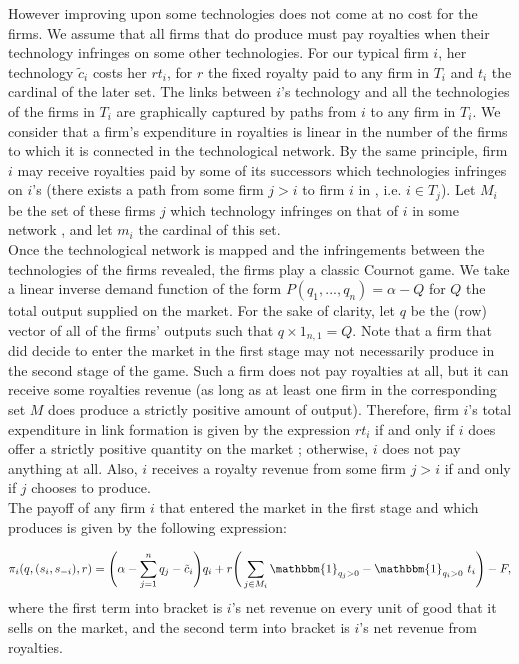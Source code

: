 \documentclass{article}
\begin{document}
\indent However improving upon some technologies does not come at no cost for the firms. We assume that all firms that do produce must pay royalties when their technology infringes on some other technologies. For our typical firm $i$, her technology $\tilde{c}_i$ costs her $rt_i$, for $r$ the fixed royalty paid to any firm in $T_i$ and $t_i$ the cardinal of the later set. The links between $i$'s technology and all the technologies of the firms in $T_i$ are graphically captured by paths from $i$ to any firm in $T_i$. We consider that a firm's expenditure in royalties is linear in the number of the firms to which it is connected in the technological network. By the same principle, firm $i$ may receive royalties paid by some of its successors which technologies infringes on $i$'s (there exists a path from some firm $j>i$ to firm $i$ in , i.e. $i\in T_j$). Let $M_i$ be the set of these firms $j$ which technology infringes on that of $i$ in some network , and let $m_i$ the cardinal of this set.\\

\indent Once the technological network is mapped and the infringements between the technologies of the firms revealed, the firms play a classic Cournot game. We take a linear inverse demand function of the form $P(q_1,...,q_n)=\alpha - Q$ for $Q$ the total output supplied on the market. For the sake of clarity, let $q$ be the (row) vector of all of the firms' outputs such that $q\times 1_{n,1}=Q$. Note that a firm that did decide to enter the market in the first stage may not necessarily produce in the second stage of the game. Such a firm does not pay royalties at all, but it can receive some royalties revenue (as long as at least one firm in the corresponding set $M$ does produce a strictly positive amount of output). Therefore, firm $i$'s total expenditure in link formation is given by the expression $r t_i$ if and only if $i$ does offer a strictly positive quantity on the market ; otherwise, $i$ does not pay anything at all. Also, $i$ receives a royalty revenue from some firm $j>i$ if and only if $j$ chooses to produce.\\

The payoff of any firm $i$ that entered the market in the first stage and which produces is given by the following expression: 

\begin{equation}
\pi_i(q, (s_i,s_{-i}),r) = \Bigg(\alpha - \sum_{j=1}^n q_j - \tilde{c}_i \Bigg)q_i + r\Bigg( \sum_{j\in M_i}\mathbbm{1}_{q_j>0} - \mathbbm{1}_{q_i>0}~ t_i\Bigg)  - F \label{payoff},
\end{equation}  
where the first term into bracket is $i$'s net revenue on every unit of good that it sells on the market, and the second term into bracket is $i$'s net revenue from royalties. \\
\end{document}
